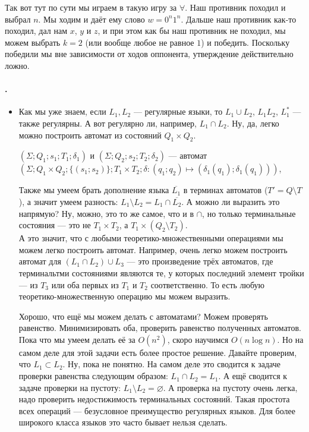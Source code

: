 \documentclass{article}
\begin{document}
\begin{itemize}
\begin{Comment}
            Так вот тут по сути мы играем в такую игру за $\forall$. Наш противник походил и выбрал $n$. Мы ходим и даёт ему слово $w=0^n1^n$. Дальше наш противник как-то походил, дал нам $x$, $y$ и $z$, и при этом как бы наш противник не походил, мы можем выбрать $k=2$ (или вообще любое не равное $1$) и победить. Поскольку победили мы вне зависимости от ходов оппонента, утверждение действительно ложно.
        \end{Comment}
    \end{itemize}
    \paragraph{.}
    \begin{itemize}
        \item[]
        \begin{Comment}
            Как мы уже знаем, если $L_1,L_2$ --- регулярные языки, то $L_1\cup L_2$, $L_1L_2$, $L_1^*$ --- также регулярны. А вот регулярно ли, например, $L_1\cap L_2$. Ну, да, легко можно построить автомат из состояний $Q_1\times Q_2$.
        \end{Comment}
        \dfn {} $(\Sigma;Q_1;s_1;T_1;\delta_1)$ и $(\Sigma;Q_2;s_2;T_2;\delta_2)$ --- автомат $(\Sigma;Q_1\times Q_2;\{(s_1;s_2)\};T_1\times T_2;\delta\colon(q_1;q_2)\mapsto(\delta_1(q_1);\delta_1(q_1)))$,
        \begin{Comment}
            Также мы умеем брать дополнение языка $\overline{L_1}$ в терминах автоматов ($T'=Q\setminus T$), а значит умеем разность: $L_1\setminus L_2=L_1\cap\overline{L_2}$. А можно ли выразить это напрямую? Ну, можно, это то же самое, что и в $\cap$, но только терминальные состояния --- это не $T_1\times T_2$, а $T_1\times(Q_2\setminus T_2)$.\\
            А это значит, что с любыми теоретико-множественными операциями мы можем легко построить автомат. Например, очень легко можем построить автомат для $(L_1\cap L_2)\cup L_3$ --- это произведение трёх автоматов, где терминальтми состояниями являются те, у которых последний элемент тройки --- из $T_3$ или оба первых из $T_1$ и $T_2$ соответственно. То есть любую теоретико-множественную операцию мы можем выразить.
        \end{Comment}
        \begin{Comment}
            Хорошо, что ещё мы можем делать с автоматами? Можем проверять равенство. Минимизировать оба, проверить равенство полученных автоматов. Пока что мы умеем делать её за $O(n^2)$, скоро научимся $O(n\log n)$. Но на самом деле для этой задачи есть более простое решение. Давайте проверим, что $L_1\subset L_2$. Ну, пока не понятно. На самом деле это сводится к задаче проверки равенства следующим образом: $L_1\cap L_2=L_1$. А ещё сводится к задаче проверки на пустоту: $L_1\setminus L_2=\varnothing$. А проверка на пустоту очень легка, надо проверить недостижимость терминальных состояний. Такая простота всех операций --- безусловное преимущество регулярных языков. Для более широкого класса языков это часто бывает нельзя сделать.

\end{Comment}
\end{itemize}
\end{document}
